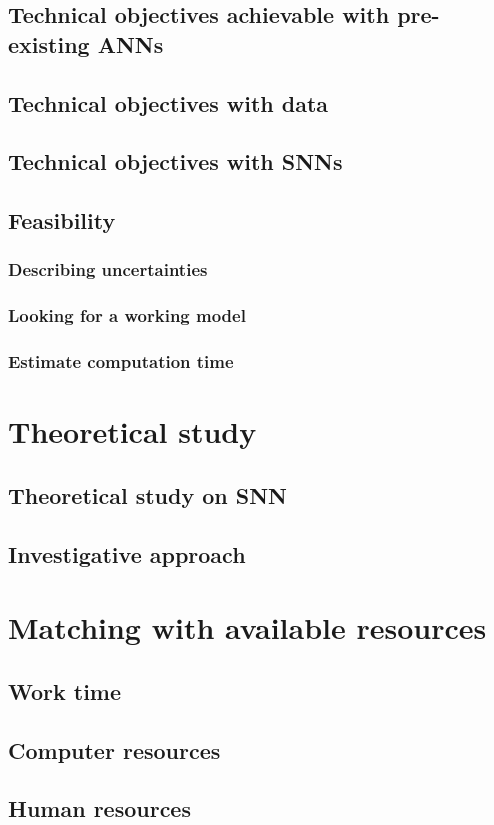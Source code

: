 \documentclass{article}
\begin{document}
\subsection{Technical objectives achievable with pre-existing ANNs}
\subsection{Technical objectives with data}
\subsection{Technical objectives with SNNs}
\subsection{Feasibility}
\subsubsection{Describing uncertainties}
\subsubsection{Looking for a working model}
\subsubsection{Estimate computation time}

\section{Theoretical study}
\subsection{Theoretical study on SNN}
\subsection{Investigative approach}

\section{Matching with available resources}
\subsection{Work time}
\subsection{Computer resources}
\subsection{Human resources}

\pagebreak



\end{document}
